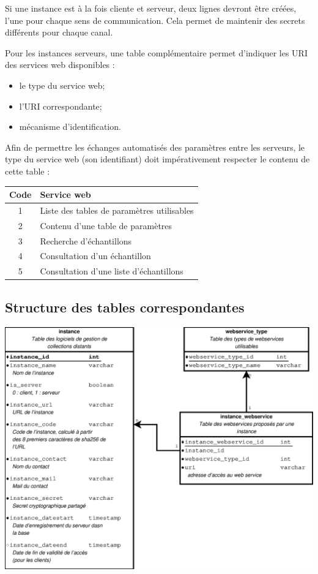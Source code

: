 Si une instance est à la fois cliente et serveur, deux lignes devront être créées, l'une pour chaque sens de communication. Cela permet de maintenir des secrets différents pour chaque canal.

Pour les instances \og serveurs\fg{}, une table complémentaire permet d'indiquer les URI des services web disponibles :
\begin{itemize}
\item le type du service web;
\item l'URI correspondante;
\item mécanisme d'identification.
\end{itemize}

Afin de permettre les échanges automatisés des paramètres entre les serveurs, le type du service web (son identifiant) doit impérativement respecter le contenu de cette table :
\begin{longtable}{|c|>{\raggedright\arraybackslash}p{10cm}|}
\hline 
Code & Service web  \\ 
\hline \endhead
1 & Liste des tables de paramètres utilisables \\
\hline
2 & Contenu d'une table de paramètres \\
\hline
3 & Recherche d'échantillons \\
\hline
4 & Consultation d'un échantillon \\
\hline
5 & Consultation d'une liste d'échantillons\\
\hline

\end{longtable}

\subsection{Structure des tables correspondantes}

\includegraphics[width=\linewidth]{images/tables_declaration_instances}

